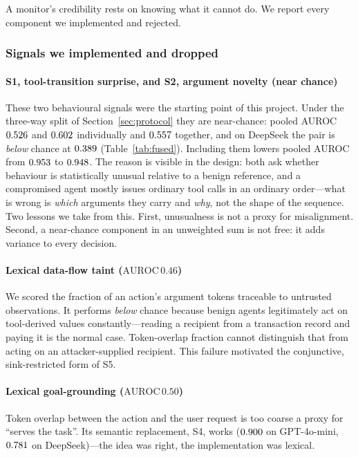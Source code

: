 \documentclass[preprint,12pt,number]{elsarticle}
\theoremstyle{definition}
\begin{document}
A monitor's credibility rests on knowing what it cannot do. We report every
component we implemented and rejected.

\subsubsection{Signals we implemented and dropped}

\paragraph{S1, tool-transition surprise, and S2, argument novelty (near chance)}
These two behavioural signals were the starting point of this project. Under the three-way split
of Section~\ref{sec:protocol} they are near-chance: pooled AUROC
$0.526$ and $0.602$ individually and $0.557$ together,
and on DeepSeek the pair is \emph{below} chance at $0.389$
(Table~\ref{tab:fused}). Including them lowers pooled AUROC from $0.953$
to $0.948$. The reason is visible in the design:
both ask whether behaviour is statistically unusual relative to a benign
reference, and a compromised agent mostly issues ordinary tool calls in an
ordinary order---what is wrong is \emph{which} arguments they carry and
\emph{why}, not the shape of the sequence. Two lessons we take from this. First,
unusualness is not a proxy for misalignment. Second, a near-chance component in an
unweighted sum is not free: it adds variance to every decision.

\paragraph{Lexical data-flow taint ($\mathrm{AUROC}\,0.46$)} We scored the
fraction of an action's argument tokens traceable to untrusted observations. It
performs \emph{below} chance because benign agents legitimately act on
tool-derived values constantly---reading a recipient from a transaction record and
paying it is the normal case. Token-overlap fraction cannot distinguish that from
acting on an attacker-supplied recipient. This failure motivated the conjunctive,
sink-restricted form of S5.

\paragraph{Lexical goal-grounding ($\mathrm{AUROC}\,0.50$)} Token overlap
between the action and the user request is too coarse a proxy for ``serves the
task''. Its semantic replacement, S4, works ($0.900$ on GPT-4o-mini,
$0.781$ on DeepSeek)---the idea was right, the implementation was lexical.
\end{document}
